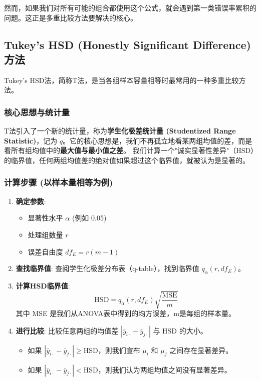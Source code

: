 \documentclass[12pt, a4paper]{amsart}
\begin{document}
然而，如果我们对所有可能的组合都使用这个公式，就会遇到第一类错误率累积的问题。这正是多重比较方法要解决的核心。

\subsection{Tukey's HSD (Honestly Significant Difference) 方法}
Tukey's HSD法，简称T法，是当各组样本容量相等时最常用的一种多重比较方法。

\subsubsection{核心思想与统计量}
T法引入了一个新的统计量，称为\textbf{学生化极差统计量 (Studentized Range Statistic)}，记为 $q$。它的核心思想是，我们不再孤立地看某两组均值的差，而是看所有组均值中的\textbf{最大值与最小值之差}。
我们计算一个"诚实显著性差异"（HSD）的临界值，任何两组均值差的绝对值如果超过这个临界值，就被认为是显著的。

\subsubsection{计算步骤 (以样本量相等为例)}
\begin{enumerate}
    \item \textbf{确定参数}:
        \begin{itemize}
            \item 显著性水平 $\alpha$ (例如 0.05)
            \item 处理组数量 $r$
            \item 误差自由度 $df_E = r(m-1)$
        \end{itemize}
    \item \textbf{查找临界值}: 查阅学生化极差分布表（q-table），找到临界值 $q_{\alpha}(r, df_E)$。
    \item \textbf{计算HSD临界值}:
        \begin{equation}
        \text{HSD} = q_{\alpha}(r, df_E) \sqrt{\frac{\text{MSE}}{m}}
        \label{eq:hsd}
        \end{equation}
        其中 MSE 是我们从ANOVA表中得到的均方误差，m是每组的样本量。
    \item \textbf{进行比较}: 比较任意两组的均值差 $|\bar{y}_{i\cdot} - \bar{y}_{j\cdot}|$ 与 HSD 的大小。
        \begin{itemize}
            \item 如果 $|\bar{y}_{i\cdot} - \bar{y}_{j\cdot}| \geq \text{HSD}$，则我们宣布 $\mu_i$ 和 $\mu_j$ 之间存在显著差异。
            \item 如果 $|\bar{y}_{i\cdot} - \bar{y}_{j\cdot}| < \text{HSD}$，则我们认为两组均值之间没有显著差异。
        \end{itemize}
\end{enumerate}
\end{document}
